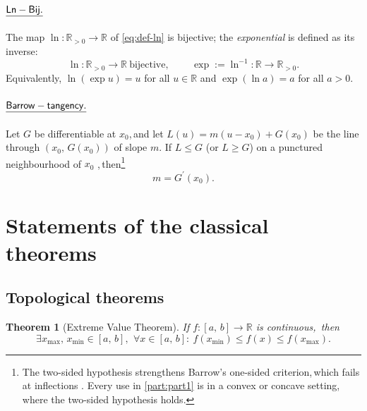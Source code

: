 \documentclass[11pt,reqno]{amsart}
\providecommand{\R}{\mathbb{R}}
\theoremstyle{redplain}
\newtheorem{theorem}{Theorem}
\begin{document}
\paragraph{$\mathsf{\protect\underline{Ln-Bij.}}$}

\text{\ } The map $\ln:\R_{>0}\to\R$ of \autoref{eq:def-ln} is bijective;
the \emph{exponential} is defined as its inverse: 
\begin{equation}  \label{eq:ln-bij}
\ln:\R_{>0}\to\R\ \text{bijective},\,\allowbreak\qquad \exp:=\ln^{-1}\colon\R%
\to\R_{>0}.
\end{equation}
Equivalently, $\ln(\exp u)=u$ for all $u\in\R$ and $\exp(\ln a)=a$ for all $%
a>0$.

\paragraph{$\mathsf{\protect\underline{Barrow-tangency.}}$}

\text{\ } Let $G$ be differentiable at $x_0$,\,\allowbreak and let $%
L(u)=m(u-x_0)+G(x_0)$ be the line through $(x_0,\,\allowbreak G(x_0))$ of
slope $m$. If $L\le G$ (or $L\ge G$) on a punctured neighbourhood of $x_0$%
,\,\allowbreak then\footnote{%
The two-sided hypothesis strengthens Barrow's one-sided
criterion,\,\allowbreak which fails at inflections \cite{Lopez2026}. Every
use in \autoref{part:part1} is in a convex or concave setting,\,\allowbreak
where the two-sided hypothesis holds.} 
\begin{equation}  \label{eq:barrow-tangency}
m=G^{\prime }(x_0).
\end{equation}

\section{Statements of the classical theorems}

\subsection{Topological theorems}

\begin{theorem}[Extreme Value Theorem]
\label{thm:evt} If $f:[a,\,\allowbreak b]\to\R$ is continuous,\,\allowbreak
then 
\begin{equation}  \label{eq:evt}
\exists x_{\max},\,\allowbreak x_{\min}\in[a,\,\allowbreak b],\,\allowbreak\
\forall x\in[a,\,\allowbreak b]:\ f(x_{\min})\le f(x)\le f(x_{\max}).
\end{equation}
\end{theorem}
\end{document}
